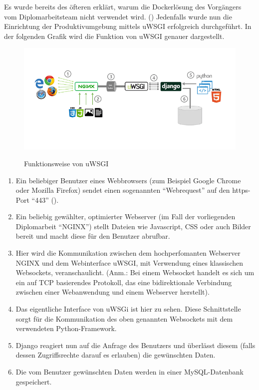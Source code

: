 \documentclass[
]{article}
\providecommand{\tightlist}{%
  \setlength{\itemsep}{0pt}\setlength{\parskip}{0pt}}
\begin{document}
Es wurde bereits des öfteren erklärt, warum die Dockerlösung des
Vorgängers vom Diplomarbeitsteam nicht verwendet wird.
() Jedenfalls wurde nun die
Einrichtung der Produktivumgebung mittels uWSGI erfolgreich
durchgeführt. In der folgenden Grafik wird die Funktion von uWSGI
genauer dargestellt.

\begin{figure}[ht]
\centering
\includegraphics{uwsgi.png}
\caption{Funktionsweise von uWSGI}
\cite{uwsgi}
\end{figure}

\begin{enumerate}
\def\labelenumi{\arabic{enumi}.}
\tightlist
\item
  Ein beliebiger Benutzer eines Webbrowsers (zum Beispiel Google Chrome
  oder Mozilla Firefox) sendet einen sogenannten ``Webrequest'' auf den
  https-Port ``443'' ().
\item
  Ein beliebig gewählter, optimierter Webserver (im Fall der
  vorliegenden Diplomarbeit ``NGINX'') stellt Dateien wie Javascript,
  CSS oder auch Bilder bereit und macht diese für den Benutzer abrufbar.
\item
  Hier wird die Kommunikation zwischen dem hochperfomanten Webserver
  NGINX und dem Webinterface uWSGI, mit Verwendung eines klassischen
  Websockets, veranschaulicht. (Anm.: Bei einem Websocket handelt es
  sich um ein auf TCP basierendes Protokoll, das eine bidirektionale
  Verbindung zwischen einer Webanwendung und einem Webserver herstellt).
\item
  Das eigentliche Interface von uWSGi ist hier zu sehen. Diese
  Schnittstelle sorgt für die Kommunikation des oben genannten
  Websockets mit dem verwendeten Python-Framework.
\item
  Django reagiert nun auf die Anfrage des Benutzers und überlässt diesem
  (falls dessen Zugriffsrechte darauf es erlauben) die gewünschten
  Daten.
\item
  Die vom Benutzer gewünschten Daten werden in einer MySQL-Datenbank
  gespeichert.
\end{enumerate}
\end{document}
